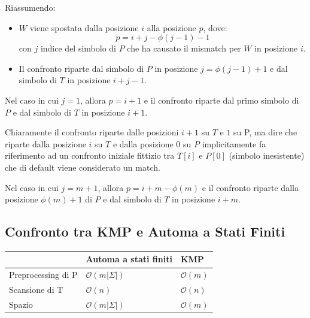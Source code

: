 Riassumendo:
\begin{itemize}
    \item $W$ viene spostata dalla posizione $i$ alla posizione $p$, dove:
          \begin{equation}
              p = i + j - \phi(j - 1) - 1
          \end{equation}
          con $j$ indice del simbolo di $P$ che ha causato il mismatch per $W$
          in posizione $i$.
    \item Il confronto riparte dal simbolo di $P$ in posizione $j = \phi(j - 1)
              + 1$ e dal simbolo di $T$ in posizione $i + j - 1$.
\end{itemize}
Nel caso in cui $j = 1$, allora $p = i + 1$ e il confronto riparte dal primo
simbolo di $P$ e dal simbolo di $T$ in posizione $i + 1$.
\begin{nota}
    Chiaramente il confronto riparte dalle posizioni $i + 1$ su $T$ e $1$ su P,
    ma dire che riparte dalla posizione $i$ su $T$ e dalla posizione $0$ su $P$
    implicitamente fa riferimento ad un confronto iniziale fittizio tra $T[i]$ e
    $P[0]$ (simbolo inesistente) che di default viene considerato un match.
\end{nota}
Nel caso in cui $j = m + 1$, allora $p = i + m - \phi(m)$ e il confronto
riparte dalla posizione $\phi(m) + 1$ di $P$ e dal simbolo di $T$ in posizione
$i + m$.
\subsection{Confronto tra KMP e Automa a Stati Finiti}
\begin{table}[!ht]
    \centering
    \begin{tabular}{|l|l|l|}
        \hline
                           & Automa a stati finiti     & KMP              \\ \hline
        Preprocessing di P & $\mathcal{O}(m |\Sigma|)$ & $\mathcal{O}(m)$ \\ \hline
        Scansione di T     & $\mathcal{O}(n)$          & $\mathcal{O}(n)$ \\ \hline
        Spazio             & $\mathcal{O}(m |\Sigma|)$ & $\mathcal{O}(m)$ \\ \hline
    \end{tabular}
\end{table}

